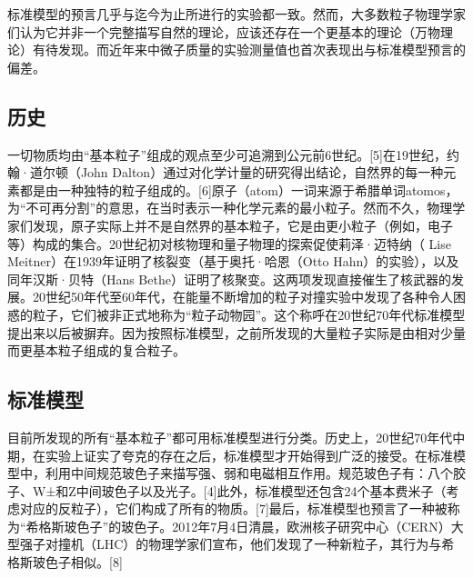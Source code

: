 标准模型的预言几乎与迄今为止所进行的实验都一致。然而，大多数粒子物理学家们认为它并非一个完整描写自然的理论，应该还存在一个更基本的理论（万物理论）有待发现。而近年来中微子质量的实验测量值也首次表现出与标准模型预言的偏差。

\subsection{历史}
一切物质均由“基本粒子”组成的观点至少可追溯到公元前6世纪。[5]在19世纪，约翰·道尔顿（John Dalton）通过对化学计量的研究得出结论，自然界的每一种元素都是由一种独特的粒子组成的。[6]原子（atom）一词来源于希腊单词atomos，为“不可再分割”的意思，在当时表示一种化学元素的最小粒子。然而不久，物理学家们发现，原子实际上并不是自然界的基本粒子，它是由更小粒子（例如，电子等）构成的集合。20世纪初对核物理和量子物理的探索促使莉泽·迈特纳（ Lise Meitner）在1939年证明了核裂变（基于奥托·哈恩（Otto Hahn）的实验），以及同年汉斯·贝特（Hans Bethe）证明了核聚变。这两项发现直接催生了核武器的发展。20世纪50年代至60年代，在能量不断增加的粒子对撞实验中发现了各种令人困惑的粒子，它们被非正式地称为“粒子动物园”。这个称呼在20世纪70年代标准模型提出来以后被摒弃。因为按照标准模型，之前所发现的大量粒子实际是由相对少量而更基本粒子组成的复合粒子。

\subsection{标准模型}
目前所发现的所有“基本粒子”都可用标准模型进行分类。历史上，20世纪70年代中期，在实验上证实了夸克的存在之后，标准模型才开始得到广泛的接受。在标准模型中，利用中间规范玻色子来描写强、弱和电磁相互作用。规范玻色子有：八个胶子、W±和Z中间玻色子以及光子。[4]此外，标准模型还包含24个基本费米子（考虑对应的反粒子），它们构成了所有的物质。[7]最后，标准模型也预言了一种被称为“希格斯玻色子”的玻色子。2012年7月4日清晨，欧洲核子研究中心（CERN）大型强子对撞机（LHC）的物理学家们宣布，他们发现了一种新粒子，其行为与希格斯玻色子相似。[8]

